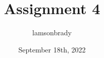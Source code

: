 \usepackage[utf8]{inputenc}

\title{Assignment 4}
\author{lamsonbrady }
\date{September 18th, 2022}

\usepackage{parskip}

\usepackage{fancyhdr}
\pagestyle{fancy}

\usepackage{amsmath}
\usepackage{amssymb}

\newcommand{\psmall}[1]{
	\left(\begin{smallmatrix}
		#1
	\end{smallmatrix} \right)
}

\newcommand{\genpmat}[1]{
	\ensuremath{
		\begin{pmatrix}
			#1
		\end{pmatrix}
	}
}
\newcommand{\genericmat}[2]{
	\ensuremath{
		\begin{#1matrix}
			#2
		\end{#1matrix}
	}
}

\newcommand{\genericvec}{
	\ensuremath{
		\left\{\vec{e_1}, \vec{e_2}, \dots, \vec{e_n} \right\}
	}
}

\newcommand{\bb}{\mathbb}
\newcommand{\R}{\mathbb{R}}
\renewcommand{\P}{\mathbb{P}}
\newcommand{\Z}{\mathbb{Z}}

\newcommand*{\myprime}{^{\prime}\mkern-1.2mu}
\newcommand*{\mydprime}{^{\prime\prime}\mkern-1.2mu}
\newcommand*{\mytrprime}{^{\prime\prime\prime}\mkern-1.2mu}

